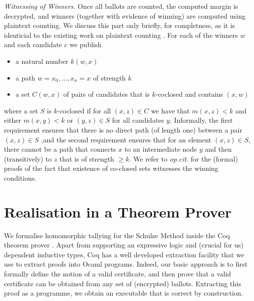 \documentclass{llncs}
\begin{document}
\smallskip\noindent\emph{Witnessing of Winners.}
Once all ballots are counted, the computed margin is decrypted, and
winners (together with evidence of winning) are computed using 
plaintext counting. We discuss this part only briefly, for completness,
 as it is identicial to the existing work on plaintext counting
\cite{Pattinson:2017:SVE}. For each of the winners $w$ and each
candidate $c$ we publish
\begin{itemize}
\item a natural number $k(w, x)$
\item a path $w = x_0, \dots, x_n = x$ of strength $k$
\item a set $C(w, x)$ of pairs of candidates that is $k$-coclosed
and contains $(x, w)$
\end{itemize}
where a set $S$ is  $k$-coclosed if for all $(x,z) \in C$ we have
that $m(x, z) < k$ and either $m(x, y) < k$ or $(y,z) \in S$ for
all candidates $y$.  Informally, the first requirement ensures that
there is no direct path (of length one) between a pair $(x, z) \in
S$ ,and the second requirement ensures that for an element $(x, z)
\in S$, there cannot be a path that connects $x$ to an intermediate
node $y$ and then (transitively) to $z$ that is of strength $\geq
k$. 
We refer to \emph{op.cit.} for the (formal)
proofs of the fact that existence of co-closed sets witnesses the
winning conditions. 
  



\section{Realisation in a Theorem Prover}

We formalise homomorphic tallying for the Schulze Method inside the
Coq theorem prover \cite{Bertot:2004:ITP}. Apart from supporting an
expressive logic and (crucial for us) dependent inductive types, Coq
has a well developed extraction facility that 
we use to extract proofs into Ocaml programs. Indeed, our basic
approach is to first formally define the notion of a valid
certificate, and then prove that a valid certificate can be obtained
from any set of (encrypted) ballots. Extracting this proof as a
programme, we obtain an executable that is correct by construction. 
\end{document}

